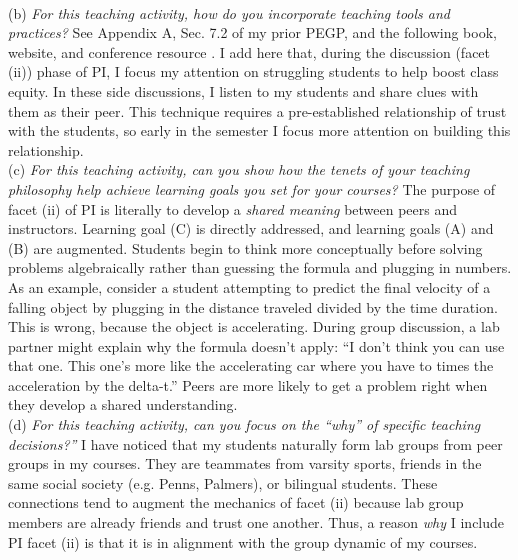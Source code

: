 \documentclass[../../../main.tex]{subfiles}
\begin{document}
\\
\vspace{0.25cm}
(b) \textit{For this teaching activity, how do you incorporate teaching tools and practices?}  See Appendix A, Sec. 7.2 of my prior PEGP, and the following book, website, and conference resource \cite{mazur2013peer,PhysPort,AAPTPI}.  I add here that, during the discussion (facet (ii)) phase of PI, I focus my attention on struggling students to help boost class equity.  In these side discussions, I listen to my students and share clues with them as their peer.  This technique requires a pre-established relationship of trust with the students, so early in the semester I focus more attention on building this relationship.
\\
\vspace{0.25cm}
(c) \textit{For this teaching activity, can you show how the tenets of your teaching philosophy help achieve learning goals you set for your courses?}  The purpose of facet (ii) of PI is literally to develop a \textit{shared meaning} between peers and instructors.  Learning goal (C) is directly addressed, and learning goals (A) and (B) are augmented.  Students begin to think more conceptually before solving problems algebraically rather than guessing the formula and plugging in numbers.  As an example, consider a student attempting to predict the final velocity of a falling object by plugging in the distance traveled divided by the time duration.  This is wrong, because the object is accelerating.  During group discussion, a lab partner might explain why the formula doesn't apply:  ``I don't think you can use that one. This one's more like the accelerating car where you have to times the acceleration by the delta-t.''  Peers are more likely to get a problem right when they develop a shared understanding.
\\
\vspace{0.25cm}
(d) \textit{For this teaching activity, can you focus on the ``why'' of specific teaching decisions?''} I have noticed that my students naturally form lab groups from peer groups in my courses.  They are teammates from varsity sports, friends in the same social society (e.g. Penns, Palmers), or bilingual students.  These connections tend to augment the mechanics of facet (ii) because lab group members are already friends and trust one another.  Thus, a reason \textit{why} I include PI facet (ii) is that it is in alignment with the group dynamic of my courses.
\\
\vspace{0.25cm}
\end{document}

